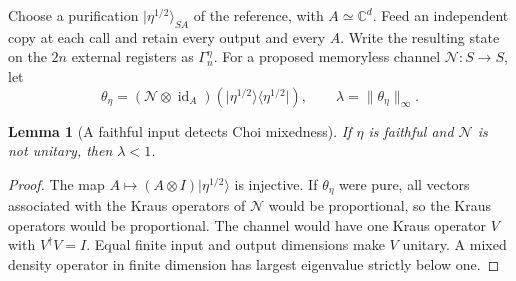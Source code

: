 \documentclass[11pt]{article}
\newtheorem{lemma}[theorem]{Lemma}
\theoremstyle{definition}\newtheorem{definition}[theorem]{Definition}
\newcommand{\id}{\operatorname{id}}
\newcommand{\cN}{\mathcal N}
\newcommand{\ket}[1]{\lvert #1\rangle}
\newcommand{\bra}[1]{\langle #1\rvert}
\newcommand{\norm}[1]{\lVert #1\rVert}
\begin{document}
Choose a purification $\ket{\eta^{1/2}}_{SA}$ of the reference, with $A\simeq\mathbb C^d$. Feed an independent copy at each call and retain every output and every $A$. Write the resulting state on the $2n$ external registers as $\Gamma_n^\eta$. For a proposed memoryless channel $\cN:S\to S$, let
\[
 \theta_\eta=(\cN\otimes\id_A)(\ket{\eta^{1/2}}\bra{\eta^{1/2}}),
 \qquad \lambda=\norm{\theta_\eta}_\infty.
\]

\begin{lemma}[A faithful input detects Choi mixedness]
If $\eta$ is faithful and $\cN$ is not unitary, then $\lambda<1$.
\end{lemma}
\begin{proof}
The map $A\mapsto(A\otimes I)\ket{\eta^{1/2}}$ is injective. If $\theta_\eta$ were pure, all vectors associated with the Kraus operators of $\cN$ would be proportional, so the Kraus operators would be proportional. The channel would have one Kraus operator $V$ with $V^\dagger V=I$. Equal finite input and output dimensions make $V$ unitary. A mixed density operator in finite dimension has largest eigenvalue strictly below one.
\end{proof}
\end{document}
